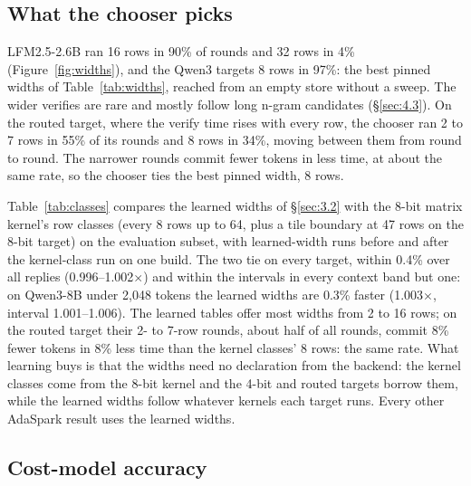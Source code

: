 \documentclass[10pt,twocolumn,letterpaper]{article}
\begin{document}
\subsection{What the chooser picks}\label{sec:4.5}



LFM2.5-2.6B ran 16 rows in 90\% of rounds and 32 rows in 4\% (Figure~\ref{fig:widths}), and the Qwen3 targets 8 rows in 97\%: the best pinned widths of Table~\ref{tab:widths}, reached from an empty store without a sweep. The wider verifies are rare and mostly follow long n-gram candidates (\S\ref{sec:4.3}). On the routed target, where the verify time rises with every row, the chooser ran 2 to 7 rows in 55\% of its rounds and 8 rows in 34\%, moving between them from round to round. The narrower rounds commit fewer tokens in less time, at about the same rate, so the chooser ties the best pinned width, 8 rows.

Table~\ref{tab:classes} compares the learned widths of \S\ref{sec:3.2} with the 8-bit matrix kernel's row classes (every 8 rows up to 64, plus a tile boundary at 47 rows on the 8-bit target) on the evaluation subset, with learned-width runs before and after the kernel-class run on one build. The two tie on every target, within 0.4\% over all replies (0.996--1.002$\times$) and within the intervals in every context band but one: on Qwen3-8B under 2,048 tokens the learned widths are 0.3\% faster (1.003$\times$, interval 1.001--1.006). The learned tables offer most widths from 2 to 16 rows; on the routed target their 2- to 7-row rounds, about half of all rounds, commit 8\% fewer tokens in 8\% less time than the kernel classes' 8 rows: the same rate. What learning buys is that the widths need no declaration from the backend: the kernel classes come from the 8-bit kernel and the 4-bit and routed targets borrow them, while the learned widths follow whatever kernels each target runs. Every other AdaSpark result uses the learned widths.



\subsection{Cost-model accuracy}\label{sec:4.6}


\end{document}
